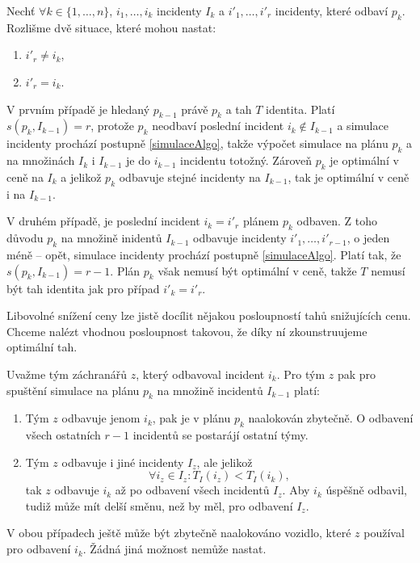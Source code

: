 \begin{dukaz}
  Nechť $\forall k \in \{ 1, \dots, n\}$, $i_1, \dots, i_k$ incidenty $I_k$ a $i'_1, \dots, i'_r$ incidenty, které odbaví $p_k$.
  Rozlišme dvě situace, které mohou nastat:
  \begin{enumerate}
    \item
      $i'_r \neq i_k$,

    \item
      $i'_r = i_k$.
  \end{enumerate}
  V prvním případě je hledaný $p_{k-1}$ právě $p_k$ a tah $T$ identita.
  Platí $s(p_k, I_{k-1}) = r$, protože $p_k$ neodbaví poslední incident $i_k \not \in I_{k-1}$ a simulace incidenty prochází postupně \ref{simulaceAlgo},
  takže výpočet simulace na plánu $p_{k}$ a na množinách $I_k$ i $I_{k-1}$ je do $i_{k-1}$ incidentu totožný.
  Zároveň $p_k$ je optimální v ceně na $I_k$ a jelikož $p_k$ odbavuje stejné incidenty na $I_{k-1}$, tak je optimální v ceně i na $I_{k-1}$.

  V druhém případě, je poslední incident $i_k = i'_r$ plánem $p_k$ odbaven.
  Z toho důvodu $p_k$ na množině inidentů $I_{k-1}$ odbavuje incidenty $i'_1, \dots, i'_{r-1}$, o jeden méně -- opět, simulace incidenty prochází postupně \ref{simulaceAlgo}.
  Platí tak, že $s(p_k, I_{k-1}) = r - 1$. Plán $p_k$ však nemusí být optimální v ceně, takže $T$ nemusí být tah identita jak pro případ $i'_k = i'_r$. 

  Libovolné snížení ceny lze jistě docílit nějakou posloupností tahů snižujících cenu.
  Chceme nalézt vhodnou posloupnost takovou, že díky ní zkounstruujeme optimální tah.

  Uvažme tým záchranářů $z$, který odbavoval incident $i_k$.
  Pro tým $z$ pak pro spuštění simulace na plánu $p_k$ na množině incidentů $I_{k-1}$ platí:
  \begin{enumerate}
    \item
      Tým $z$ odbavuje jenom $i_k$, pak je v plánu $p_k$ naalokován zbytečně. O odbavení všech ostatních $r-1$ incidentů se postarájí ostatní týmy.

    \item
      Tým $z$ odbavuje i jiné incidenty $I_z$, ale jelikož
      \begin{equation*}
        \forall i_z \in I_z \colon T_I(i_z) < T_I(i_k),
      \end{equation*}
      tak $z$ odbavuje $i_k$ až po odbavení všech incidentů $I_z$.
      Aby $i_k$ úspěšně odbavil, tudiž může mít delší směnu, než by měl, pro odbavení $I_z$.
  \end{enumerate}
  V obou případech ještě může být zbytečně naalokováno vozidlo, které $z$ používal pro odbavení $i_k$.
  Žádná jiná možnost nemůže nastat.


\end{dukaz}
